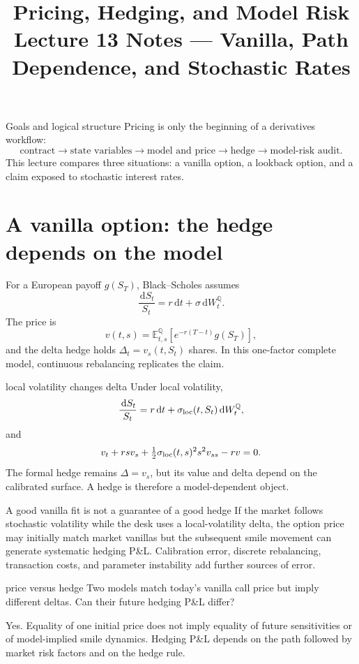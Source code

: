 \documentclass[10pt]{article}
\title{\textbf{Pricing, Hedging, and Model Risk}\\\large Lecture 13 Notes --- Vanilla, Path Dependence, and Stochastic Rates}
\author{}\date{}
\newcommand{\E}{\mathbb E}\newcommand{\Q}{\mathbb Q}\newcommand{\cF}{\mathcal F}
\newcommand{\dd}{\,\mathrm d}
\theoremstyle{definition}\newtheorem{definition}{Definition}[section]
\begin{document}
\maketitle\vspace{-1.4em}
\begin{keyidea}{Goals and logical structure}
Pricing is only the beginning of a derivatives workflow:
\[
\text{contract}\longrightarrow\text{state variables}\longrightarrow
\text{model and price}\longrightarrow\text{hedge}\longrightarrow\text{model-risk audit}.
\]
This lecture compares three situations: a vanilla option, a lookback option,
and a claim exposed to stochastic interest rates.
\end{keyidea}

\section{A vanilla option: the hedge depends on the model}
For a European payoff \(g(S_T)\), Black--Scholes assumes
\[
\frac{\dd S_t}{S_t}=r\dd t+\sigma\dd W_t^\Q.
\]
The price is
\[
v(t,s)=\E^\Q_{t,s}[e^{-r(T-t)}g(S_T)],
\]
and the delta hedge holds \(\Delta_t=v_s(t,S_t)\) shares. In this
one-factor complete model, continuous rebalancing replicates the claim.

\begin{boardexample}{local volatility changes delta}
Under local volatility,
\[
\frac{\dd S_t}{S_t}=r\dd t+\sigma_{\rm loc}(t,S_t)\dd W_t^\Q,
\]
and
\[
v_t+rs v_s+\tfrac12\sigma_{\rm loc}(t,s)^2s^2v_{ss}-rv=0.
\]
The formal hedge remains \(\Delta=v_s\), but its value and delta depend on
the calibrated surface. A hedge is therefore a model-dependent object.
\end{boardexample}

\begin{warningbox}{A good vanilla fit is not a guarantee of a good hedge}
If the market follows stochastic volatility while the desk uses a
local-volatility delta, the option price may initially match market vanillas
but the subsequent smile movement can generate systematic hedging P\&L.
Calibration error, discrete rebalancing, transaction costs, and parameter
instability add further sources of error.
\end{warningbox}

\begin{studentexercise}{price versus hedge}
Two models match today's vanilla call price but imply different deltas.
Can their future hedging P\&L differ?
\end{studentexercise}
\begin{shortsolution}
Yes. Equality of one initial price does not imply equality of future
sensitivities or of model-implied smile dynamics. Hedging P\&L depends on
the path followed by market risk factors and on the hedge rule.
\end{shortsolution}
\end{document}
